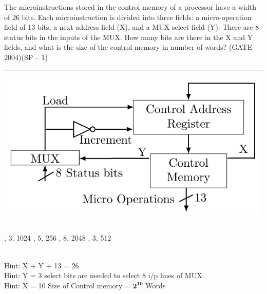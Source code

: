 \begin{questyle}
  \question  The microinstructions stored in the control memory of a processor have a width of 26 bits.
             Each microinstruction is divided into three fields: a micro-operation field of 13 bits, a
             next address field (X), and a MUX select field (Y). There are 8 status bits in the inputs
             of the MUX.  How many bits are there in the X and Y fields, and what is the size of the
             control memory in number of words? (GATE-2004)(SP – 1)

             \begin{myTableStyle} \begin{tabular}{ |m{14cm}| } \hline
                  \begin{center} \includegraphics[scale=0.4]{./images/control_memory.jpeg} \end{center}\\ \hline
            \end{tabular} \end{myTableStyle} \vspace{0.08in}

  \begin{oneparchoices}
    , 3, 1024
    , 5, 256
    , 8, 2048
    , 3, 512
  \end{oneparchoices}
  \\Hint: \quad X + Y + 13 = 26
  \\Hint: \quad Y = 3   select bits are needed to select 8 i/p lines of MUX
  \\Hint: \quad X = 10 \qquad Size of Control memory = \( \mathbf { 2^{10} } \) Words
\end{questyle}
